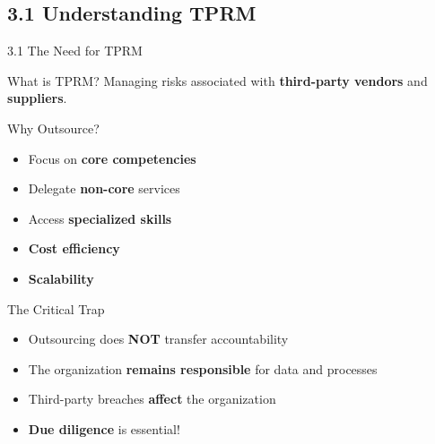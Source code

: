 \documentclass{beamer}
\begin{document}
	\subsection{3.1 Understanding TPRM}
	\begin{frame}{3.1 The Need for TPRM}
		\begin{block}{What is TPRM?}
			Managing risks associated with \textbf{third-party vendors} and \textbf{suppliers}.
		\end{block}
		
		\begin{block}{Why Outsource?}
			\begin{itemize}
				\item Focus on \textbf{core competencies}
				\item Delegate \textbf{non-core} services
				\item Access \textbf{specialized skills}
				\item \textbf{Cost efficiency}
				\item \textbf{Scalability}
			\end{itemize}
		\end{block}
		
		\begin{alertblock}{The Critical Trap}
			\begin{itemize}
				\item Outsourcing does \textbf{NOT} transfer accountability
				\item The organization \textbf{remains responsible} for data and processes
				\item Third-party breaches \textbf{affect} the organization
				\item \textbf{Due diligence} is essential!
			\end{itemize}
		\end{alertblock}
	\end{frame}
	
\end{document}
